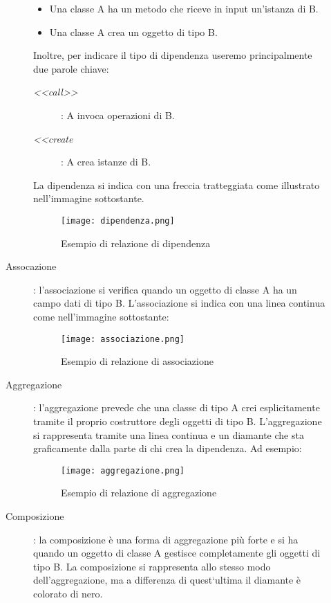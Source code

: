 \documentclass[../../norme-di-progetto.tex]{subfiles}
\begin{document}
\begin{description}
\begin{description}
\begin{itemize}
        \item Una classe A ha un metodo che riceve in input un'istanza di B.
        \item Una classe A crea un oggetto di tipo B.
      \end{itemize}
      Inoltre, per indicare il tipo di dipendenza useremo principalmente due parole chiave:
      \begin{description}
        \item [\textit{<<call>>}]: A invoca operazioni di B.
        \item [\textit{<<create}]: A crea istanze di B.
      \end{description}
      La dipendenza si indica con una freccia tratteggiata come illustrato nell'immagine sottostante.
      \begin{figure}[H]%
        \label{fig:dipendenza}
        \texttt{[image: dipendenza.png]}
        \centering
        \caption{Esempio di relazione di dipendenza}
      \end{figure}
    \item [Assocazione]: l'associazione si verifica quando un oggetto di classe A ha un campo dati di tipo B. L'associazione si indica con una linea continua come nell'immagine sottostante:
    \begin{figure}[H]%
      \label{fig:associazione}
      \texttt{[image: associazione.png]}
      \centering
      \caption{Esempio di relazione di associazione}
    \end{figure}
    \item [Aggregazione]: l'aggregazione prevede che una classe di tipo A crei esplicitamente tramite il proprio costruttore degli oggetti di tipo B. L'aggregazione si rappresenta tramite una linea continua e un diamante che sta graficamente dalla parte di chi crea la dipendenza. Ad esempio:
    \begin{figure}[H]%
      \label{fig:aggregazione}
      \texttt{[image: aggregazione.png]}
      \centering
      \caption{Esempio di relazione di aggregazione}
    \end{figure}
    \item [Composizione]: la composizione è una forma di aggregazione più forte e si ha quando un oggetto di classe A gestisce completamente gli oggetti di tipo B. La composizione si rappresenta allo stesso modo dell'aggregazione, ma a differenza di quest`ultima il diamante è colorato di nero.
    \begin{figure}[H]%
      \label{fig:composizione}

\end{figure}
\end{description}
\end{description}
\end{document}

